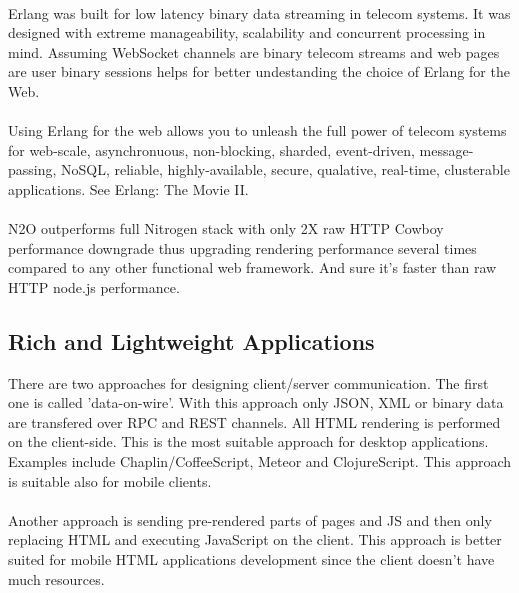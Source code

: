 
\paragraph{}
Erlang was built for low latency binary data streaming in telecom systems.
It was designed with extreme manageability, scalability
and concurrent processing in mind. Assuming WebSocket channels are binary
telecom streams and web pages are user binary sessions
helps for better undestanding the choice of Erlang for the Web.

\paragraph{}
Using Erlang for the web allows you to unleash the full power of telecom systems for
web-scale, asynchronuous, non-blocking, sharded, event-driven,
message-passing, NoSQL, reliable, highly-available,
secure, qualative, real-time, clusterable applications. See Erlang: The Movie II.

\paragraph{}
N2O outperforms full Nitrogen stack with only 2X raw HTTP Cowboy
performance downgrade thus upgrading rendering performance several
times compared to any other functional web framework. And
sure it's faster than raw HTTP node.js performance.

\subsection{Rich and Lightweight Applications}
There are two approaches for designing client/server communication.
The first one is called 'data-on-wire'. With this approach only JSON, XML or binary
data are transfered over RPC and REST channels. All HTML rendering
is performed on the client-side. This is the most suitable approach for desktop
applications. Examples include Chaplin/CoffeeScript, Meteor
and ClojureScript. This approach is suitable also for mobile clients.

\paragraph{}
Another approach is sending pre-rendered parts of pages and JS
and then only replacing HTML and executing JavaScript on the client. This approach
is better suited for mobile HTML applications development since the
client doesn't have much resources.

